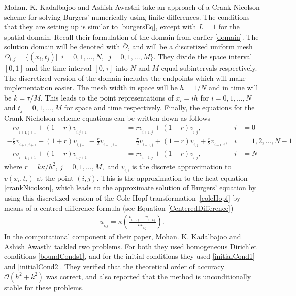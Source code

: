 \documentclass[undefended]{sfuthesis}
\begin{document}
Mohan. K. Kadalbajoo and Ashish Awasthi \cite{burgerCrankNicolson} take an approach of a Crank-Nicolson scheme for solving Burgers' numerically using finite differences. The conditions that they are setting up is similar to \eqref{burgersEq}, except with $L = 1$ for the spatial domain. Recall their formulation of the domain from earlier \eqref{domain}. The solution domain will be denoted with $\bar{\Omega}$, and will be a discretized uniform mesh $\bar{\Omega}_{i,j} = \{(x_i, t_j) | \,\,\, i = 0,1,\dots,N,\,\,\, j = 0, 1, \dots, M\}$. They divide the space interval $[0, 1]$ and the time interval $[0, \tau]$ into $N$ and $M$ equal subintervals respectively. The discretized version of the domain includes the endpoints which will make implementation easier. The mesh width in space will be $h = 1/N$ and in time will be $k = \tau/M$. This leads to the point representations of $x_i = ih$ for $i = 0, 1, \dots, N$ and $t_j = 0, 1, \dots, M$ for space and time respectively. Finally, the equations for the Crank-Nicholson scheme equations can be written down as follows
\begin{subequations}
	\label{crankNicolson}
	\begin{align}
	- r v_{_{i+1,j+1}} + (1 + r) v_{_{i, j + 1}} &= rv_{_{i + 1, j}} + (1 - r) v_{_{i,j}}, & i &= 0 \\
	-\frac{r}{2} v_{_{i + 1,j + 1}} + (1 + r) v_{_{i, j + 1}} - \frac{r}{2} v_{_{i - 1, j + 1}} &= \frac{r}{2} v_{_{i + 1, j}} + (1 - r) v_{_{i, j}} + \frac{r}{2} v_{_{i - 1, j}}, & i &= 1, 2, \dots, N - 1 \\
	- r v_{_{i - 1, j + 1}} + (1 + r) v_{_{i, j + 1}} &= r v_{_{i - 1, j}} + (1 - r) v_{_{i, j}}, & i &= N
	\end{align}
\end{subequations}
where $r = k \kappa / h^2$, $j = 0, 1, \dots, M,$ and $v_{_{i, j}}$ is the discrete approximation to $v(x_i, t_i)$ at the point $(i, j)$. This is the approximation to the heat equation \eqref{crankNicolson}, which leads to the approximate solution of Burgers' equation by using this discretized version of the Cole-Hopf transformation~\eqref{coleHopf} by means of a centred difference formula (see Equation \ref{CenteredDifference})
\begin{align}
u_{_{i, j}} = \kappa \left(\frac{v_{_{i + 1, j}} - v_{_{i - 1, j}}}{h v_{_{i, j}}}\right). \label{coleHopfDiscrete}
\end{align}
In the computational component of their paper, Mohan. K. Kadalbajoo and Ashish Awasthi tackled two problems. For both they used homogeneous Dirichlet conditions \eqref{boundConds1}, and for the initial conditions they used \eqref{initialCond1} and \eqref{initialCond2}. They verified that the theoretical order of accuracy $\mathcal{O}(h^2 + k^2)$ was correct, and also reported that the method is unconditionally stable for these problems.
\end{document}
